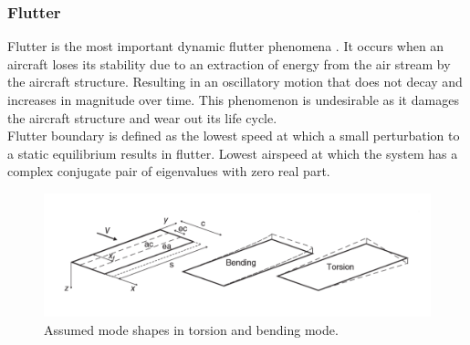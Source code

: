 \documentclass[11pt]{article}
\begin{document}
\subsubsection{Flutter}
Flutter is the most important dynamic flutter phenomena \cite{MohammedFREEWINGS}. It occurs when an aircraft loses its stability due to an extraction of energy from the air stream by the aircraft structure. Resulting in an oscillatory motion that does not decay and increases in magnitude over time. This phenomenon is undesirable as it damages the aircraft structure and wear out its life cycle.\\

Flutter boundary is defined as  the lowest speed at which a small perturbation to a static equilibrium results in flutter. Lowest airspeed at which the system has a complex conjugate pair of eigenvalues with zero real part. 
\vspace{-1cm}
\begin{figure}[H]
    \centering
    \includegraphics[width = .8\textwidth]{figures/torsion-bending-modes.png}
    \caption{Assumed mode shapes in torsion and bending mode.}
    \label{fig:binary}
\end{figure}
\end{document}
